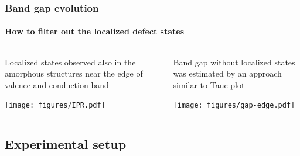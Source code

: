 \documentclass[noamsthm,8pt,t,xcolor={dvipsnames}]{beamer}
\begin{document}
\begin{frame}
   \frametitle{Band gap evolution}
   \framesubtitle{How to filter out the localized defect states}

   \begin{columns}
      \begin{column}{0.5\textwidth}
         Localized states observed also in the amorphous structures near the edge of valence and conduction band
         \begin{center}
            \texttt{[image: figures/IPR.pdf]}
         \end{center}
      \end{column}
      \pause
      \begin{column}{0.5\textwidth}
         Band gap without localized states was estimated by an approach similar to Tauc plot
         \begin{center}
            \texttt{[image: figures/gap-edge.pdf]}
         \end{center}
      \end{column}
   \end{columns}
\end{frame}

\subsection{Experimental setup}
\end{document}
